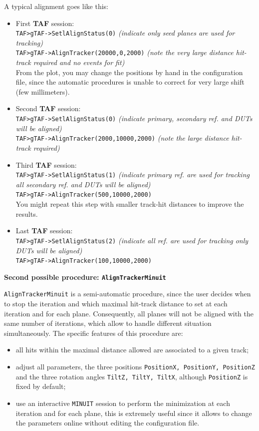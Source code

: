 \documentclass[a4paper, 12pt, twoside]{article}
\newcommand{\TAF}{{\bf TAF }}
\begin{document}
\noindent
A typical alignment goes like this:
\begin{itemize}
\setlength{\itemsep}{1mm}
\item First \TAF session:\\
{\tt TAF>gTAF->SetlAlignStatus(0)} {\it(indicate only seed planes are used for tracking)}\\
{\tt TAF>gTAF->AlignTracker(20000,0,2000)} {\it(note the very large distance hit-track required and no events for fit)}\\
From the plot, you may change the positions by hand in the configuration file, since the automatic procedures is unable to correct for very large shift (few millimeters). 
\item Second \TAF session:\\
{\tt TAF>gTAF->SetlAlignStatus(0)} {\it(indicate primary, secondary ref. and DUTs will be aligned)}\\
{\tt TAF>gTAF->AlignTracker(2000,10000,2000)} {\it(note the large distance hit-track required)}
\item Third \TAF session:\\
{\tt TAF>gTAF->SetlAlignStatus(1)} {\it(indicate primary ref. are used for tracking all secondary ref. and DUTs will be aligned)}\\
{\tt TAF>gTAF->AlignTracker(500,10000,2000)}\\
You might repeat this step with smaller track-hit distances to improve the results.
\item Last \TAF session:\\
{\tt TAF>gTAF->SetlAlignStatus(2)} {\it(indicate all ref. are used for tracking only DUTs will be aligned)}\\
{\tt TAF>gTAF->AlignTracker(100,10000,2000)}\\
\end{itemize}

\vspace{0.8 cm}

\noindent
{\bf Second possible procedure: {\tt AlignTrackerMinuit}}

\noindent
{\tt AlignTrackerMinuit} is a semi-automatic procedure, since the user decides when to stop the iteration and which maximal hit-track distance to set at each iteration and for each plane. Consequently, all planes will not be aligned with the same number of iterations, which allow to handle different situation simultaneously.
The specific features of this procedure are:
\begin{itemize}
\item all hits within the maximal distance allowed are associated to a given track;
\item adjust all parameters, the three positions {\tt PositionX, PositionY, PositionZ} and the three rotation angles {\tt TiltZ, TiltY, TiltX}, although {\tt PositionZ} is fixed by default;
\item use an interactive {\tt MINUIT} session to perform the minimization at each iteration and for each plane, this is extremely useful since it allows to change the parameters online without editing the configuration file.
\end{itemize}
\end{document}
